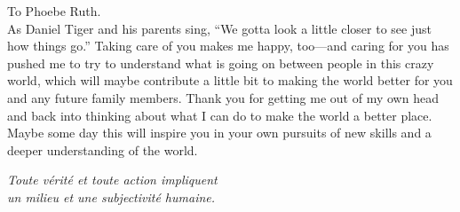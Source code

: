 \documentclass[12pt,chapterheads]{UCMerced}
\begin{document}
\begin{frontmatter}
\makefrontmatter %

%
%


\begin{dedication} %
  To Phoebe Ruth.  \\[2em]
  As Daniel Tiger and his parents sing, ``We gotta look a little 
  closer to see just how things go.'' Taking care of you makes me happy, 
  too---and caring for you has pushed me to try to 
  understand what is going on between people 
  in this crazy world, which
  will maybe contribute a little bit to making the world better for you and
  any future family members. Thank you for getting me out of my own
  head and back into thinking about what I can do to make the world a better
  place. Maybe some day this will inspire you in your own pursuits of new skills and
  a deeper understanding of the world.
\end{dedication}

%   
% 



\begin{epigraph} %
  \emph{Toute v\'{e}rit\'{e} et toute action impliquent \\
  un milieu et une subjectivit\'{e} humaine.}\\[2em]


\end{epigraph}
\end{frontmatter}
\end{document}
